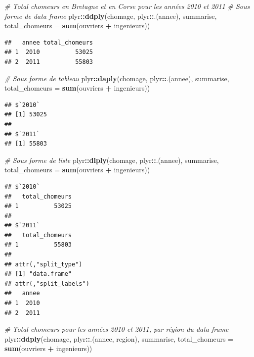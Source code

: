 \documentclass[
  11pt,
]{book}
\newenvironment{Shaded}{\begin{snugshade}}{\end{snugshade}}
\newcommand{\CommentTok}[1]{\textcolor[rgb]{0.56,0.35,0.01}{\textit{#1}}}
\newcommand{\DataTypeTok}[1]{\textcolor[rgb]{0.13,0.29,0.53}{#1}}
\newcommand{\KeywordTok}[1]{\textcolor[rgb]{0.13,0.29,0.53}{\textbf{#1}}}
\newcommand{\NormalTok}[1]{#1}
\newcommand{\OperatorTok}[1]{\textcolor[rgb]{0.81,0.36,0.00}{\textbf{#1}}}
\newcommand{\StringTok}[1]{\textcolor[rgb]{0.31,0.60,0.02}{#1}}
\numberwithin{equation}{section}
\numberwithin{countremarque}{section}
\begin{document}
\begin{Shaded}
\begin{Highlighting}[]
\CommentTok{\# Total chomeurs en Bretagne et en Corse pour les années 2010 et 2011}
\CommentTok{\# Sous forme de data frame}
\NormalTok{plyr}\OperatorTok{::}\KeywordTok{ddply}\NormalTok{(chomage, plyr}\OperatorTok{::}\NormalTok{.(annee), summarise, }\DataTypeTok{total\_chomeurs =} \KeywordTok{sum}\NormalTok{(ouvriers }\OperatorTok{+}\StringTok{ }\NormalTok{ingenieurs))}
\end{Highlighting}
\end{Shaded}

\begin{lstlisting}
##   annee total_chomeurs
## 1  2010          53025
## 2  2011          55803
\end{lstlisting}

\begin{Shaded}
\begin{Highlighting}[]
\CommentTok{\# Sous forme de tableau}
\NormalTok{plyr}\OperatorTok{::}\KeywordTok{daply}\NormalTok{(chomage, plyr}\OperatorTok{::}\NormalTok{.(annee), summarise, }\DataTypeTok{total\_chomeurs =} \KeywordTok{sum}\NormalTok{(ouvriers }\OperatorTok{+}\StringTok{ }\NormalTok{ingenieurs))}
\end{Highlighting}
\end{Shaded}

\begin{lstlisting}
## $`2010`
## [1] 53025
## 
## $`2011`
## [1] 55803
\end{lstlisting}

\begin{Shaded}
\begin{Highlighting}[]
\CommentTok{\# Sous forme de liste}
\NormalTok{plyr}\OperatorTok{::}\KeywordTok{dlply}\NormalTok{(chomage, plyr}\OperatorTok{::}\NormalTok{.(annee), summarise, }\DataTypeTok{total\_chomeurs =} \KeywordTok{sum}\NormalTok{(ouvriers }\OperatorTok{+}\StringTok{ }\NormalTok{ingenieurs))}
\end{Highlighting}
\end{Shaded}

\begin{lstlisting}
## $`2010`
##   total_chomeurs
## 1          53025
## 
## $`2011`
##   total_chomeurs
## 1          55803
## 
## attr(,"split_type")
## [1] "data.frame"
## attr(,"split_labels")
##   annee
## 1  2010
## 2  2011
\end{lstlisting}

\begin{Shaded}
\begin{Highlighting}[]
\CommentTok{\# Total chomeurs pour les années 2010 et 2011, par région du data frame}
\NormalTok{plyr}\OperatorTok{::}\KeywordTok{ddply}\NormalTok{(chomage, plyr}\OperatorTok{::}\NormalTok{.(annee, region), summarise,}
      \DataTypeTok{total\_chomeurs =} \KeywordTok{sum}\NormalTok{(ouvriers }\OperatorTok{+}\StringTok{ }\NormalTok{ingenieurs))}
\end{Highlighting}
\end{Shaded}
\end{document}
